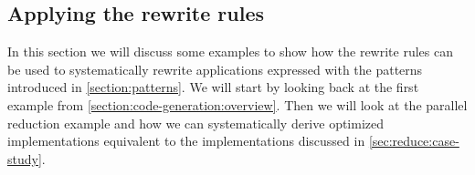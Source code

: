 %
%

\subsection{Applying the rewrite rules}
\label{sec:example}
In this section we will discuss some examples to show how the rewrite rules can be used to systematically rewrite applications expressed with the patterns introduced in \autoref{section:patterns}.
We will start by looking back at the first example from \autoref{section:code-generation:overview}.
Then we will look at the parallel reduction example and how we can systematically derive optimized implementations equivalent to the implementations discussed in \autoref{sec:reduce:case-study}.

